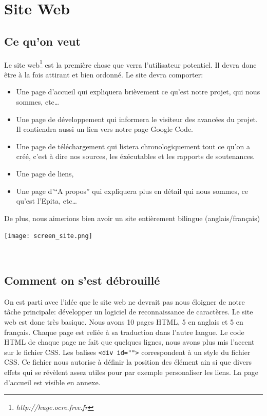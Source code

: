 \documentclass[a4paper,12pt]{report}
\newcommand{\url}[1]{\emph{#1}}
\begin{document}
\chapter{Site Web} %
\label{cha:site_web}
	\section{Ce qu'on veut} %
	\label{sec:ce_qu_on_veut}
	Le site web\footnote{\url{http://huge.ocre.free.fr}} est la premi\`ere chose que verra l'utilisateur potentiel. Il devra donc \^etre \`a la fois attirant et bien ordonn\'e. Le site devra comporter:
	\begin{itemize}
		\item Une page d'accueil qui expliquera bri\`evement ce qu'est notre projet, qui nous sommes, etc\ldots
		\item Une page de d\'eveloppement qui informera le visiteur des avanc\'ees du projet. Il contiendra aussi un lien vers notre page Google Code.
		\item Une page de t\'el\'echargement qui listera chronologiquement tout ce qu'on a cr\'e\'e, c'est \`a dire nos sources, les \'ex\'ecutables et les rapports de soutenances.
		\item Une page de liens,
		\item Une page d'``A propos'' qui expliquera plus en d\'etail qui nous sommes, ce qu'est l'Epita, etc\ldots
	\end{itemize}
	De plus, nous aimerions bien avoir un site enti\`erement bilingue (anglais/fran\c cais)
	
	\begin{center}

		\texttt{[image: screen\_site.png]}\\
		\caption{\emph{La page d'accueil du site}}\\
	\end{center}
	
	
	\section{Comment on s'est d\'ebrouill\'e} %
	\label{sec:comment_on_s_est_d'ebrouill'e}

		On est parti avec l'idée que le site web ne devrait pas nous éloigner de notre tâche principale: développer un logiciel de reconnaissance de caractères. Le site web est donc tr\`es basique. Nous avons 10 pages HTML, 5 en anglais et 5 en fran\c cais. Chaque page est reli\'ee \`a sa traduction dans l'autre langue.
		Le code HTML de chaque page ne fait que quelques lignes, nous avons plus mis l'accent sur le fichier CSS. Les balises \verb!<div id="">! correspondent \`a un style du fichier CSS. Ce fichier nous autorise \`a d\'efinir la position des \'el\'ement ain si que divers effets qui se r\'ev\`elent assez utiles pour par exemple personaliser les liens.
		La page d'accueil est visible en annexe.
		 
\end{document}
